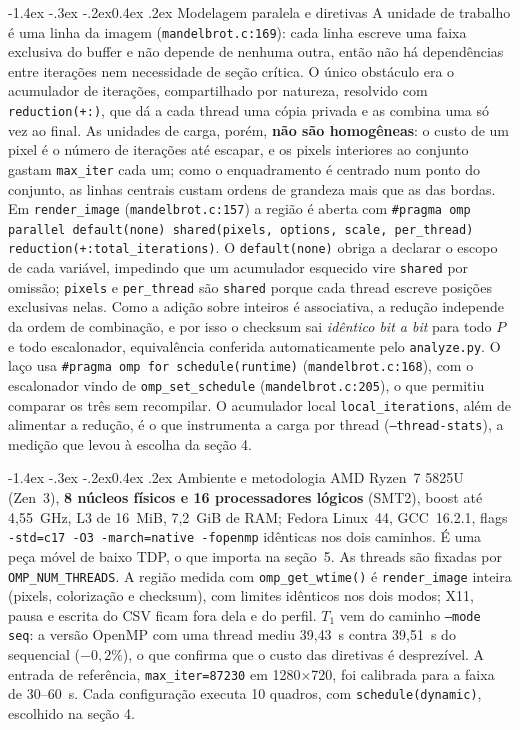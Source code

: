 \documentclass[10pt,a4paper]{article}
\makeatletter
\renewcommand\section{\@startsection{section}{1}{\z@}%
  {-1.4ex \@plus -.3ex \@minus -.2ex}{0.4ex \@plus .2ex}%
  {\normalfont\normalsize\bfseries}}
\makeatother
\begin{document}
\section{Modelagem paralela e diretivas}
A unidade de trabalho é uma linha da imagem (\texttt{mandelbrot.c:169}): cada linha escreve uma faixa exclusiva do buffer e não depende de nenhuma outra, então não há dependências entre iterações nem necessidade de seção crítica. O único obstáculo era o acumulador de iterações, compartilhado por natureza, resolvido com \texttt{reduction(+:)}, que dá a cada thread uma cópia privada e as combina uma só vez ao final. As unidades de carga, porém, \textbf{não são homogêneas}: o custo de um pixel é o número de iterações até escapar, e os pixels interiores ao conjunto gastam \texttt{max\_iter} cada um; como o enquadramento é centrado num ponto do conjunto, as linhas centrais custam ordens de grandeza mais que as das bordas. Em \texttt{render\_image} (\texttt{mandelbrot.c:157}) a região é aberta com \texttt{\#pragma omp parallel default(none) shared(pixels, options, scale, per\_thread) reduction(+:total\_iterations)}. O \texttt{default(none)} obriga a declarar o escopo de cada variável, impedindo que um acumulador esquecido vire \texttt{shared} por omissão; \texttt{pixels} e \texttt{per\_thread} são \texttt{shared} porque cada thread escreve posições exclusivas nelas. Como a adição sobre inteiros é associativa, a redução independe da ordem de combinação, e por isso o checksum sai \emph{idêntico bit a bit} para todo $P$ e todo escalonador, equivalência conferida automaticamente pelo \texttt{analyze.py}. O laço usa \texttt{\#pragma omp for schedule(runtime)} (\texttt{mandelbrot.c:168}), com o escalonador vindo de \texttt{omp\_set\_schedule} (\texttt{mandelbrot.c:205}), o que permitiu comparar os três sem recompilar. O acumulador local \texttt{local\_iterations}, além de alimentar a redução, é o que instrumenta a carga por thread (\texttt{--thread-stats}), a medição que levou à escolha da seção 4.

\section{Ambiente e metodologia}
AMD Ryzen~7 5825U (Zen~3), \textbf{8 núcleos físicos e 16 processadores lógicos} (SMT2), boost até 4{,}55~GHz, L3 de 16~MiB, 7{,}2~GiB de RAM; Fedora Linux~44, GCC~16.2.1, flags \texttt{-std=c17 -O3 -march=native -fopenmp} idênticas nos dois caminhos. É uma peça móvel de baixo TDP, o que importa na seção~5. As threads são fixadas por \texttt{OMP\_NUM\_THREADS}. A região medida com \texttt{omp\_get\_wtime()} é \texttt{render\_image} inteira (pixels, colorização e checksum), com limites idênticos nos dois modos; X11, pausa e escrita do CSV ficam fora dela e do perfil. $T_1$ vem do caminho \texttt{--mode seq}: a versão OpenMP com uma thread mediu 39{,}43~s contra 39{,}51~s do sequencial ($-0{,}2\%$), o que confirma que o custo das diretivas é desprezível. A entrada de referência, \texttt{max\_iter=87230} em 1280$\times$720, foi calibrada para a faixa de 30--60~s. Cada configuração executa 10 quadros, com \texttt{schedule(dynamic)}, escolhido na seção 4.
\end{document}
